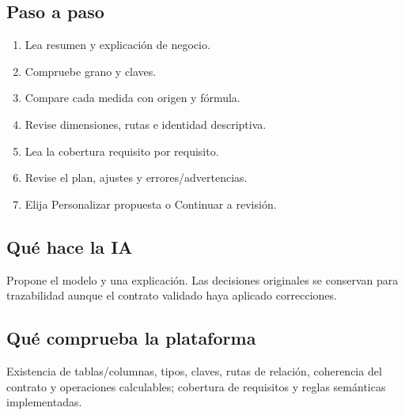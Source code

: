 \subsection{Paso a paso}
\begin{enumerate}
\item Lea resumen y explicación de negocio.\par\nopagebreak[4]
\item Compruebe grano y claves.\par\nopagebreak[4]
\item Compare cada medida con origen y fórmula.\par\nopagebreak[4]
\item Revise dimensiones, rutas e identidad descriptiva.\par\nopagebreak[4]
\item Lea la cobertura requisito por requisito.\par\nopagebreak[4]
\item Revise el plan, ajustes y errores/advertencias.\par\nopagebreak[4]
\item Elija Personalizar propuesta o Continuar a revisión.\par\nopagebreak[4]
\end{enumerate}
\subsection{Qué hace la IA}
Propone el modelo y una explicación. Las decisiones originales se conservan para trazabilidad aunque el contrato validado haya aplicado correcciones.

\subsection{Qué comprueba la plataforma}
Existencia de tablas/columnas, tipos, claves, rutas de relación, coherencia del contrato y operaciones calculables; cobertura de requisitos y reglas semánticas implementadas.


